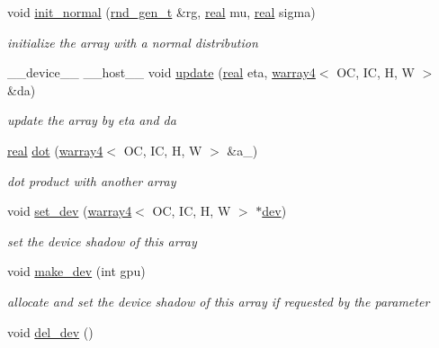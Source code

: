 \begin{DoxyCompactItemize}
void \hyperlink{structwarray4_a3a28ff48eb37b1df6f4268875fc3345f}{init\+\_\+normal} (\hyperlink{structrnd__gen__t}{rnd\+\_\+gen\+\_\+t} \&rg, \hyperlink{vgg__util_8h_a1082d08aaa761215ec83e7149f27ad16}{real} mu, \hyperlink{vgg__util_8h_a1082d08aaa761215ec83e7149f27ad16}{real} sigma)
\begin{DoxyCompactList}\small\item\em initialize the array with a normal distribution \end{DoxyCompactList}\item 
\+\_\+\+\_\+device\+\_\+\+\_\+ \+\_\+\+\_\+host\+\_\+\+\_\+ void \hyperlink{structwarray4_a6885db5ce025b11a44bdbe62c78166b2}{update} (\hyperlink{vgg__util_8h_a1082d08aaa761215ec83e7149f27ad16}{real} eta, \hyperlink{structwarray4}{warray4}$<$ OC, IC, H, W $>$ \&da)
\begin{DoxyCompactList}\small\item\em update the array by eta and da \end{DoxyCompactList}\item 
\hyperlink{vgg__util_8h_a1082d08aaa761215ec83e7149f27ad16}{real} \hyperlink{structwarray4_a2057ce210b8e265ada1792dbf15add0c}{dot} (\hyperlink{structwarray4}{warray4}$<$ OC, IC, H, W $>$ \&a\+\_\+)
\begin{DoxyCompactList}\small\item\em dot product with another array \end{DoxyCompactList}\item 
void \hyperlink{structwarray4_acc75e3d87fe7b245613c90fb433c0250}{set\+\_\+dev} (\hyperlink{structwarray4}{warray4}$<$ OC, IC, H, W $>$ $\ast$\hyperlink{structwarray4_a6ee2499ec6fa4a631652d4752905a648}{dev})
\begin{DoxyCompactList}\small\item\em set the device shadow of this array \end{DoxyCompactList}\item 
void \hyperlink{structwarray4_a568077c1b131455720d556b80700ac49}{make\+\_\+dev} (int gpu)
\begin{DoxyCompactList}\small\item\em allocate and set the device shadow of this array if requested by the parameter \end{DoxyCompactList}\item 
\mbox{\label{structwarray4_a91b452e66014159e3670760ce57a3102}} 
void \hyperlink{structwarray4_a91b452e66014159e3670760ce57a3102}{del\+\_\+dev} ()

\end{DoxyCompactItemize}
